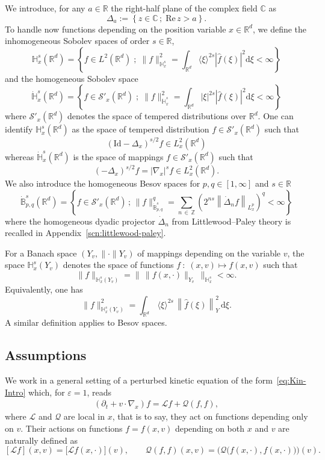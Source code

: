 \documentclass[AHL,Unicode,longabstracts,published]{cedram}
\newcommand{\Id}{\mathrm{Id}}
\renewcommand{\d}{\mathrm{d}}
\newcommand{\re}{\mathrm{Re}\,}
\newcommand{\R}{\mathbb{R}}
\newcommand{\C}{\mathbb{C}}
\newcommand{\Z}{\mathbb{Z}}
\newcommand{\bbH}{\mathbb{H}}
\newcommand{\bbB}{\mathbb{B}}
\newcommand{\LL}{\mathcal{L}}
\newcommand{\QQ}{\mathcal{Q}}
\newcommand{\scS}{\mathscr{S}}
\newcommand*\eps{{\varepsilon}}
\begin{document}
We introduce, for any $a \in \R$ the right-half plane of the complex field $\C$ as
\[
\Delta_{a}:=\left\{z \in \C\,;\;\re z >a\right\}.
\]
To handle now functions depending on the position variable $x\in \R^d$, we define the {inhomogeneous} Sobolev spaces of order $s \in \R$,
\[
\bbH^{s}_{x}(\R^{d})=\left\{f \in L^{2}(\R^{d})\;;\;\|f\|_{\bbH_{x}^{s}}^{2}=\int_{\R^{d}}\langle \xi\rangle^{2s}\left|\widehat{f}(\xi)\right|^{2}\d\xi <\infty\right\}
\]
and the homogeneous Sobolev space
\[
\dot{\bbH}^{s}_{x}(\R^{d})=\left\{f \in \scS'_x(\R^{d})\;;\;\|f\|_{\dot{\bbH}_{x}^{s}}^{2}=\int_{\R^{d}}|\xi|^{2s}\left|\widehat{f}(\xi)\right|^{2}\d\xi <\infty\right\}
\]
where $\scS'_x(\R^d)$ denotes the space of tempered distributions over $\R^d$. One can identify $\bbH^{s}_{x}(\R^{d})$ as the space of tempered distribution $f \in \scS'_{x}(\R^{d})$ such that
\[
\left(\Id-\Delta_{x}\right)^{s/2}f \in L^{2}_{x}(\R^{d})
\]
whereas $\dot{\bbH}_{x}^{s}(\R^{d})$ is the space of mappings $f \in \scS'_{x}(\R^{d})$ such that
\[
(-\Delta_{x})^{s/2}f = |\nabla_x |^s f \in L^{2}_{x}(\R^{d}).
\]
We also introduce the homogeneous Besov spaces for $p, q \in [1, \infty]$ and $s \in \R$
\[
\dot{\bbB}^s_{p, q}\left(\R^d \right) = \left\{ f \in \scS'_x \left(\R^d\right) \, ; \, \| f \|_{ \dot{\bbB}^s_{p, q} }^q = \sum_{n\,\in\,\Z} \left(2^{ n s } \left\| \dot{\Delta}_{n} f \right\|_{ L^p_x } \right)^q < \infty\right \}
\]
where the homogeneous dyadic projector $\dot{\Delta}_n$ from Littlewood--Paley theory is recalled in Appendix~\ref{scn:littlewood-paley}.


For a Banach space $(Y_{v},\|\cdot\|{Y_{v}})$ of mappings depending on the variable $v$, the space $\bbH^{s}_{x}\left(Y_{v}\right)$
denotes the space of functions $f\::\;(x,v) \mapsto f(x,v)$ such that
\[
\|f\|_{\bbH^{s}_{x}\left(Y_{v}\right)}=\big\|\,\|f(x,\cdot)\|_{Y_{v}}\,\big\|_{\bbH^{s}_{x}} < \infty.
\]
Equivalently, one has
\begin{equation}\label{eq:normHsx}
\|f\|_{\bbH^s_x\left(Y_v\right)}^2=\int_{\R^d}\,\langle\xi\rangle^{2s}\,\left\|\widehat{f}(\xi)\right\|_{Y}^2\,\d\xi.
\end{equation}
A similar definition applies to Besov spaces.

\subsection{Assumptions} 
We work in a general setting of a perturbed kinetic equation of the form~\eqref{eq:Kin-Intro} which, for $\eps=1$, reads
\begin{gather*}
(\partial_t + v \cdot \nabla_x)f = \LL f + \QQ(f, f),
\end{gather*}
where $\LL$ and $\QQ$ are local in $x$, that is to say, they act on functions depending only on $v$. Their actions on functions $f=f(x, v)$ depending on both $x$ and $v$ are naturally defined as
\[
[\LL f](x, v) = \big[\LL f(x, \cdot) \big](v), \qquad \QQ(f, f)(x, v) = \Big(\QQ\big(f(x, \cdot), f(x, \cdot) \big) \Big)(v).
\]
\end{document}
